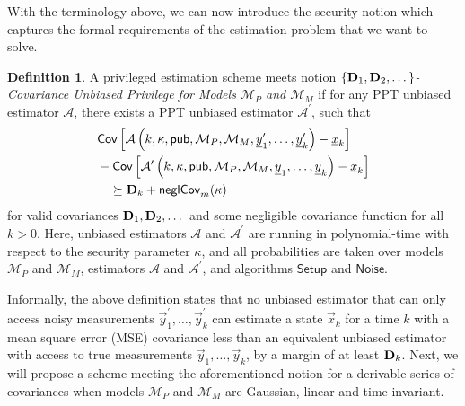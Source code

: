 \documentclass[letterpaper, 10 pt, conference]{IEEEtran}
\theoremstyle{definition}
\newtheorem{definition}{Definition}[section]
\begin{document}
With the terminology above, we can now introduce the security notion which captures the formal requirements of the estimation problem that we want to solve.
\begin{definition}\label{def:cov_privilege_security_notion}
   A privileged estimation scheme meets notion \textit{$\{{{\mathbf{D}}}_1,{{\mathbf{D}}}_2,\dots\}$-Covariance Unbiased Privilege for Models $\mathcal{M}_P$ and $\mathcal{M}_M$} if for any PPT unbiased estimator $\mathcal{A}$, there exists a PPT unbiased estimator $\mathcal{A}^\prime$, such that
   \begin{equation}\label{eqn:cov_privilege}
      \begin{split}
         &\mathsf{Cov}\left[\mathcal{A}\left(k, \kappa, \mathsf{pub}, \mathcal{M}_P, \mathcal{M}_M, \vec{y}^\prime_1,\dots,\vec{y}^\prime_k\right) - \vec{x}_k \right]\\
         &-\mathsf{Cov}\left[\mathcal{A}^\prime\left(k, \kappa, \mathsf{pub}, \mathcal{M}_P, \mathcal{M}_M, \vec{y}_1,\dots,\vec{y}_k\right) - \vec{x}_k \right]\\
         &\quad\succeq \mat{D}_k + \mathsf{neglCov}_m(\kappa)
      \end{split}
   \end{equation}
   for valid covariances ${{\mathbf{D}}}_1,{{\mathbf{D}}}_2,\dots$ and some negligible covariance function for all $k>0$. Here, unbiased estimators $\mathcal{A}$ and $\mathcal{A}^\prime$ are running in polynomial-time with respect to the security parameter $\kappa$, and all probabilities are taken over models $\mathcal{M}_P$ and $\mathcal{M}_M$, estimators $\mathcal{A}$ and $\mathcal{A}^\prime$, and algorithms $\mathsf{Setup}$ and $\mathsf{Noise}$.
\end{definition}

Informally, the above definition states that no unbiased estimator that can only access noisy measurements $\vec{y}^\prime_1,\dots,\vec{y}^\prime_k$ can estimate a state $\vec{x}_k$ for a time $k$ with a mean square error (MSE) covariance less than an equivalent unbiased estimator with access to true measurements $\vec{y}_1,\dots,\vec{y}_k$, by a margin of at least ${{\mathbf{D}}}_k$. Next, we will propose a scheme meeting the aforementioned notion for a derivable series of covariances when models $\mathcal{M}_P$ and $\mathcal{M}_M$ are Gaussian, linear and time-invariant.

% 
%                                                                                
%                                                                                
%                                                                                
% 
\end{document}
